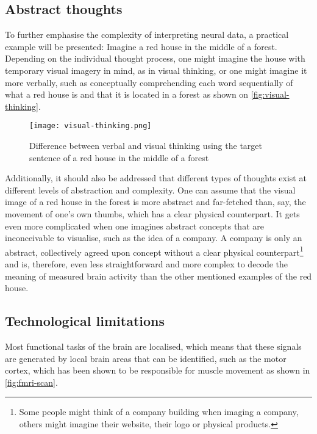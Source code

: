 \subsection{Abstract thoughts}
\label{chapter2-abstract-thoughts}

To further emphasise the complexity of interpreting neural data, a practical example will be presented: Imagine a red house in the middle of a forest. Depending on the individual thought process, one might imagine the house with temporary visual imagery in mind, as in visual thinking, or one might imagine it more verbally, such as conceptually comprehending each word sequentially of what a red house is and that it is located in a forest \citep{amit_asymmetrical_2017} as shown on \autoref{fig:visual-thinking}.

\begin{figure}[ht]
  \centering
  \texttt{[image: visual-thinking.png]}
  \caption{Difference between verbal and visual thinking using the target sentence of a red house in the middle of a forest}
  \label{fig:visual-thinking}
\end{figure}

Additionally, it should also be addressed that different types of thoughts exist at different levels of abstraction and complexity. One can assume that the visual image of a red house in the forest is more abstract and far-fetched than, say, the movement of one's own thumbs, which has a clear physical counterpart. It gets even more complicated when one imagines abstract concepts that are inconceivable to visualise, such as the idea of a company. A company is only an abstract, collectively agreed upon concept without a clear physical counterpart\footnote{Some people might think of a company building when imaging a company, others might imagine their website, their logo or physical products.} and is, therefore, even less straightforward and more complex to decode the meaning of measured brain activity than the other mentioned examples of the red house.

\subsection{Technological limitations}
\label{chapter2-technological-limitations}

Most functional tasks of the brain are localised, which means that these signals are generated by local brain areas that can be identified, such as the motor cortex, which has been shown to be responsible for muscle movement as shown in \autoref{fig:fmri-scan}.


